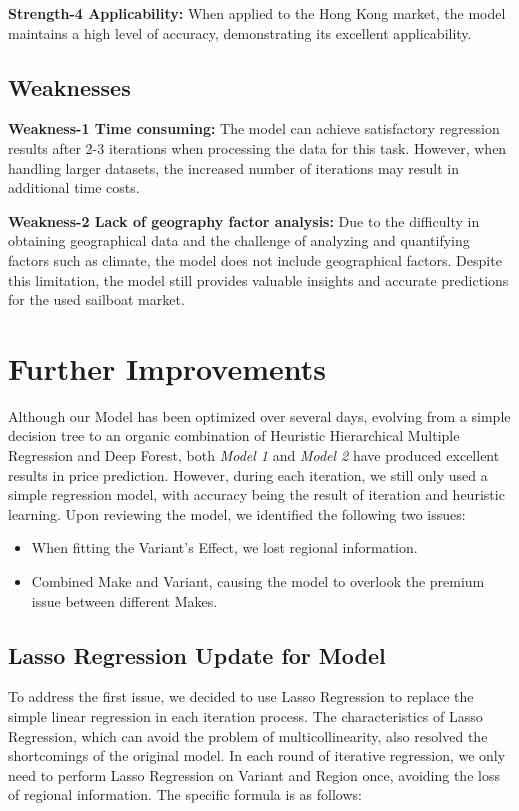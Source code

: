 \documentclass[12pt]{article}  %
\begin{document}
\textbf{Strength-4 Applicability:}
When applied to the Hong Kong market, the model maintains a high level of accuracy, demonstrating its excellent applicability. 

\subsection{Weaknesses}
\textbf{Weakness-1 Time consuming:}
The model can achieve satisfactory regression results after 2-3 iterations when processing the data for this task. However, when handling larger datasets, the increased number of iterations may result in additional time costs.

\textbf{Weakness-2 Lack of geography  factor analysis:}
Due to the difficulty in obtaining geographical data and the challenge of analyzing and quantifying factors such as climate, the model does not include geographical factors. Despite this limitation, the model still provides valuable insights and accurate predictions for the used sailboat market.

\section{Further Improvements}
Although our Model has been optimized over several days, evolving from a simple decision tree to an organic combination of Heuristic Hierarchical Multiple Regression and Deep Forest, both \emph{Model 1} and \emph{Model 2} have produced excellent results in price prediction. However, during each iteration, we still only used a simple regression model, with accuracy being the result of iteration and heuristic learning. Upon reviewing the model, we identified the following two issues:
\begin{itemize}
    \item When fitting the Variant's Effect, we lost regional information.
    \item Combined Make and Variant, causing the model to overlook the premium issue between different Makes.
\end{itemize}
\subsection{Lasso Regression Update for Model}
To address the first issue, we decided to use Lasso Regression to replace the simple linear regression in each iteration process. The characteristics of Lasso Regression, which can avoid the problem of multicollinearity, also resolved the shortcomings of the original model. In each round of iterative regression, we only need to perform Lasso Regression on Variant and Region once, avoiding the loss of regional information. The specific formula is as follows:
\end{document}
